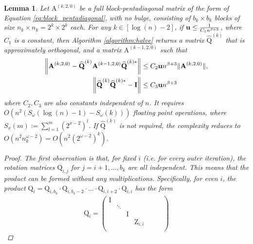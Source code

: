 \documentclass{article}
\newcommand{\lnorm}{\left\|}
\newcommand{\rnorm}{\right\|}
\newcommand{\lpar}{\left(}
\newcommand{\rpar}{\right)}
\newtheorem{lemma}{Lemma}[section]
\newcommand\matA{\boldsymbol{\mathrm{A}}}
\newcommand\matI{\boldsymbol{\mathrm{I}}}
\newcommand\matQ{\boldsymbol{\mathrm{Q}}}
\newcommand\matZ{\boldsymbol{\mathrm{Z}}}
\newcommand\matQhat{\widehat{\boldsymbol{\mathrm{Q}}}}
\newcommand{\umach}{\textbf{\textup{u}}}
\newcommand{\cmm}{\beta}
\begin{document}
\begin{lemma}
    \label{lemma:bandwidth_halving_floating_point_appendix}
    Let $\matA^{(k,2,0)}$ be a full block-pentadiagonal matrix of the form of Equation \eqref{eq:block_pentadiagonal}, with no bulge, consisting of $b_k\times b_k$ blocks of size $n_k\times n_k=2^{k}\times 2^{k}$ each. For any $k\in [\log(n)-2]$, if $\umach\leq \tfrac{1}{C_1n^{\cmm+3}}$, where $C_1$ is a constant, then Algorithm \ref{algorithm:halve} returns a matrix $\matQhat^{(k)}$ that is approximately orthogonal, and a matrix $\matA^{(k-1,2,0)}$ such that
    \begin{align*}
        \lnorm 
            \matA^{(k,2,0)} - \matQhat^{(k)}\matA^{(k-1,2,0)} \matQhat^{(k)*}
        \rnorm
        &\leq
        C_2\umach n^{\cmm+3}\|\matA^{(k,2,0)}\|,
        \\
        \lnorm 
            \matQhat^{(k)}\matQhat^{(k)*} - \matI
        \rnorm
        &\leq
        C_3\umach n^{\cmm+3}
    \end{align*}
    where $C_2,C_3$ are also constants independent of $n$. It requires 
    $O\lpar
        n^2
        \lpar 
            S_{\omega}(\log(n)-1)
            -
            S_{\omega}(k)
        \rpar
    \rpar$
    floating point operations, where $S_{x}(m):=\sum_{l=1}^{m} \lpar 2^{x-2} \rpar^{l}$. If $\matQhat^{(k)}$ is not required, the complexity reduces to 
    $O(n^2n_k^{\omega-2})=O(n^2(2^{\omega-2})^k)$.
    \begin{proof}
        The first observation is that, for fixed $i$ (i.e. for every outer iteration), the rotation matrices  $\matQ_{i,j}$ for $j=i+1,\ldots,b_k$ are all independent. This means that the  product can be formed without any multiplications. Specifically, for even $i$, the product $\matQ_i=\matQ_{i,b_k}\cdot\matQ_{i,b_k-2}\cdot\ldots\cdot\matQ_{i,i+2}\cdot\matQ_{i,i}$ has the form
        \begin{align}
            \label{eq:lemma_bandwidth_halving_q_i_block_diagonal_form}
            \matQ_i=\begin{pmatrix}
            \matI &       &      &                 &                 &       &                  \\
                 & \ddots &      &                 &                 &       &                  \\
                 &       & \matI &                 &                 &       &                  \\
                 &       &      & \matZ_{i,i} &                 &       &                  \\

\end{pmatrix}
\end{align}
\end{proof}
\end{lemma}
\end{document}
